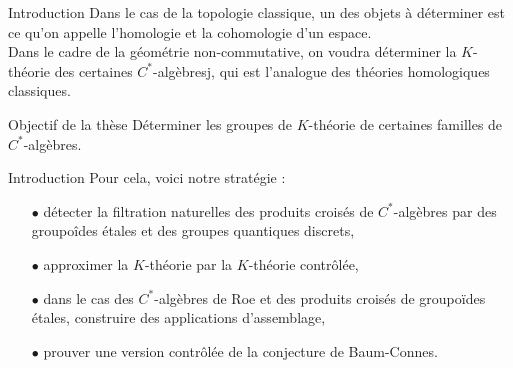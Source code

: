 \begin{frame}{Introduction}
Dans le cas de la topologie classique, un des objets à déterminer est ce qu'on appelle l'homologie et la cohomologie d'un espace.\\
\vspace{0.3 cm}
Dans le cadre de la géométrie non-commutative, on voudra déterminer la $K$-théorie des certaines $C^*$-algèbresj, qui est l'analogue des théories homologiques classiques. 
\vspace{0.3 cm}
\begin{block}{Objectif de la thèse}
Déterminer les groupes de $K$-théorie de certaines familles de $C^*$-algèbres.
\end{block}
\end{frame}

\begin{frame}{Introduction}
Pour cela, voici notre stratégie :\\
\vspace{0.3 cm}
\begin{itemize}
\item[$\bullet$] détecter la filtration naturelles des produits croisés de $C^*$-algèbres par des groupoîdes étales et des groupes quantiques discrets,
\vspace{0.3 cm}
\item[$\bullet$] approximer la $K$-théorie par la $K$-théorie contrôlée,
\vspace{0.3 cm}
\item[$\bullet$] dans le cas des $C^*$-algèbres de Roe et des produits croisés de groupoïdes étales, construire des applications d'assemblage,
\vspace{0.3 cm}
\item[$\bullet$] prouver une version contrôlée de la conjecture de Baum-Connes.
\end{itemize}
\end{frame}
